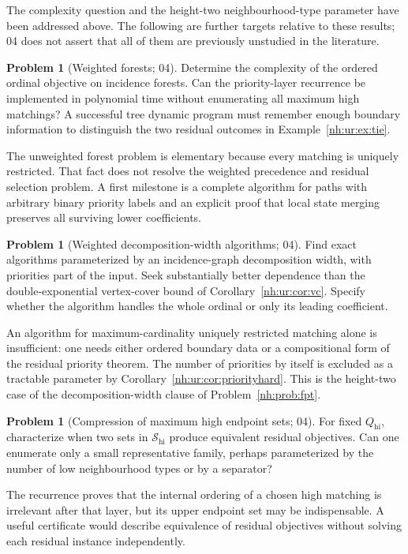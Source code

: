 \documentclass[11pt,a4paper]{article}
\theoremstyle{definition}
\newtheorem{problem}[theorem]{Problem}
\theoremstyle{remark}
\newcommand{\Qhi}{Q_{\mathrm{hi}}}
\begin{document}
The complexity question and the height-two neighbourhood-type parameter have
been addressed above. The following are further targets relative to these
results; 04 does not assert that all of them are previously unstudied in the
literature.

\begin{problem}[Weighted forests; 04]\label{nh:ur:prob:forests}
Determine the complexity of the ordered ordinal objective on incidence
forests. Can the priority-layer recurrence be implemented in polynomial time
without enumerating all maximum high matchings? A successful tree dynamic
program must remember enough boundary information to distinguish the two
residual outcomes in Example~\ref{nh:ur:ex:tie}.
\end{problem}
The unweighted forest problem is elementary because every matching is
uniquely restricted. That fact does not resolve the weighted precedence and
residual selection problem. A first milestone is a complete algorithm for
paths with arbitrary binary priority labels and an explicit proof that local
state merging preserves all surviving lower coefficients.

\begin{problem}[Weighted decomposition-width algorithms; 04]\label{nh:ur:prob:width}
Find exact algorithms parameterized by an incidence-graph decomposition width,
with priorities part of the input. Seek substantially better dependence than
the double-exponential vertex-cover bound of Corollary~\ref{nh:ur:cor:vc}.
Specify whether the algorithm handles the whole ordinal or only its leading
coefficient.
\end{problem}
An algorithm for maximum-cardinality uniquely restricted matching alone is
insufficient: one needs either ordered boundary data or a compositional form of
the residual priority theorem. The number of priorities by itself is excluded
as a tractable parameter by Corollary~\ref{nh:ur:cor:priorityhard}. This is
the height-two case of the decomposition-width clause of
Problem~\ref{nh:prob:fpt}.

\begin{problem}[Compression of maximum high endpoint sets; 04]\label{nh:ur:prob:endpoints}
For fixed $\Qhi$, characterize when two sets in $\mathscr S_{\mathrm{hi}}$
produce equivalent residual objectives. Can one enumerate only a small
representative family, perhaps parameterized by the number of low
neighbourhood types or by a separator?
\end{problem}
The recurrence proves that the internal ordering of a chosen high matching is
irrelevant after that layer, but its upper endpoint set may be indispensable.
A useful certificate would describe equivalence of residual objectives without
solving each residual instance independently.
\end{document}
